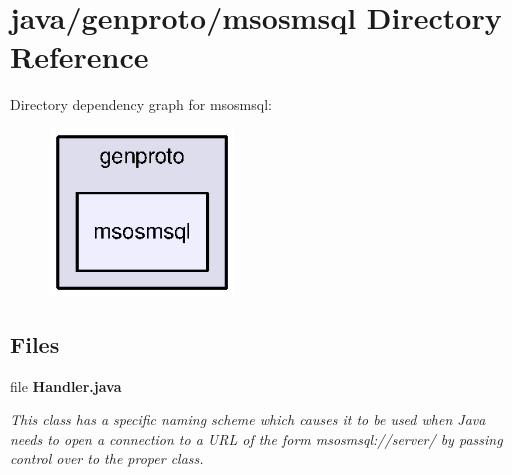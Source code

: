 \section{java/genproto/msosmsql Directory Reference}
\label{dir_daea5a5e15a03b5a636711ea6b9b0987}
Directory dependency graph for msosmsql\+:\nopagebreak
\begin{figure}[H]
\begin{center}
\leavevmode
\includegraphics[width=138pt]{dir_daea5a5e15a03b5a636711ea6b9b0987_dep}
\end{center}
\end{figure}
\subsection*{Files}
\begin{DoxyCompactItemize}
\item 
file {\bf Handler.\+java}
\begin{DoxyCompactList}\small\item\em This class has a specific naming scheme which causes it to be used when Java needs to open a connection to a U\+R\+L of the form msosmsql\+://server/ by passing control over to the proper class. \end{DoxyCompactList}\end{DoxyCompactItemize}

